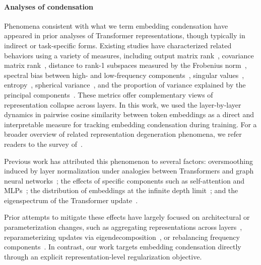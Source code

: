 \documentclass{article}
\theoremstyle{plain}
\theoremstyle{definition}
\theoremstyle{remark}
\begin{document}
\paragraph{Analyses of condensation}
Phenomena consistent with what we term embedding condensation have appeared in prior analyses of Transformer representations, though typically in indirect or task-specific forms. Existing studies have characterized related behaviors using a variety of measures, including output matrix rank~\cite{shi2022revisiting}, covariance matrix rank~\cite{li2025tracing}, distance to rank-1 subspaces measured by the Frobenius norm~\cite{dong2021attention}, spectral bias between high- and low-frequency components~\cite{wang2022anti}, singular values~\cite{zhang2025mitigating}, entropy~\cite{liao2024assessing, tokarchuk2026representation}, spherical variance~\cite{tokarchuk2026representation}, and the proportion of variance explained by the principal components~\cite{ethayarajh2019contextual}. These metrics offer complementary views of representation collapse across layers. In this work, we used the layer-by-layer dynamics in pairwise cosine similarity between token embeddings as a direct and interpretable measure for tracking embedding condensation during training. For a broader overview of related representation degeneration phenomena, we refer readers to the survey of~\cite{dovonon2024setting}.

Previous work has attributed this phenomenon to several factors: oversmoothing induced by layer normalization under analogies between Transformers and graph neural networks~\cite{shi2022revisiting}; the effects of specific components such as self-attention and MLPs~\cite{dong2021attention}; the distribution of embeddings at the infinite depth limit~\cite{Math_Transformer}; and the eigenspectrum of the Transformer update~\cite{dovonon2024setting}.

Prior attempts to mitigate these effects have largely focused on architectural or parameterization changes, such as aggregating representations across layers~\cite{shi2022revisiting}, reparameterizing updates via eigendecomposition~\cite{dovonon2024setting}, or rebalancing frequency components~\cite{wang2022anti}. In contrast, our work targets embedding condensation directly through an explicit representation-level regularization objective.

\vspace{-12pt}
\end{document}
